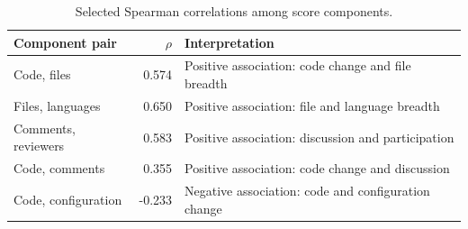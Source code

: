 \begin{table}[!h]
\caption{Selected Spearman correlations among score components.}\label{tab:components}
\centering\small
\begin{tabular}{lrp{}}
\toprule
Component pair & $\rho$ & Interpretation \\
\midrule
Code, files & 0.574 & Positive association: code change and file breadth \\
Files, languages & 0.650 & Positive association: file and language breadth \\
Comments, reviewers & 0.583 & Positive association: discussion and participation \\
Code, comments & 0.355 & Positive association: code change and discussion \\
Code, configuration & -0.233 & Negative association: code and configuration change \\
\bottomrule
\end{tabular}
\end{table}

